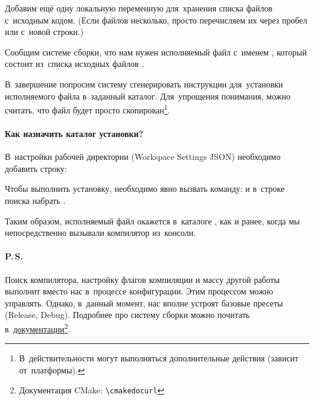 \noindent Добавим ещё одну локальную переменную  для~хранения списка файлов с~исходным кодом. (Если файлов несколько, просто перечисляем их через пробел или с~новой строки.)


\noindent Сообщим системе сборки, что нам нужен исполняемый файл с~именем , который состоит из~списка исходных файлов .


В~завершение попросим систему сгенерировать инструкции для~установки исполняемого файла в~заданный каталог. Для~упрощения понимания, можно считать, что файл будет просто скопирован\footnote{В~действительности могут выполняться дополнительные действия (зависит от~платформы).}.




\paragraph{Как назначить каталог установки?}
В~настройки рабочей директории (\textenglish{Workspace Settings JSON}) необходимо добавить строку:


Чтобы выполнить установку, необходимо явно вызвать команду:  и в~строке поиска набрать .

Таким образом, исполняемый файл окажется в~каталоге , как и ранее, когда мы непосредственно вызывали компилятор из~консоли.



\paragraph{P.\,S.}
Поиск компилятора, настройку флагов компиляции и массу другой работы  выполнит вместо нас в~процессе конфигурации. Этим процессом можно управлять. Однако, в~данный момент, нас вполне устроят базовые пресеты (\textenglish{Release, Debug}). Подробнее про систему сборки  можно почитать в~\href{\cmakedocurl}{документации}\footnote{Документация CMake: \nolinkurl{\cmakedocurl}}.




